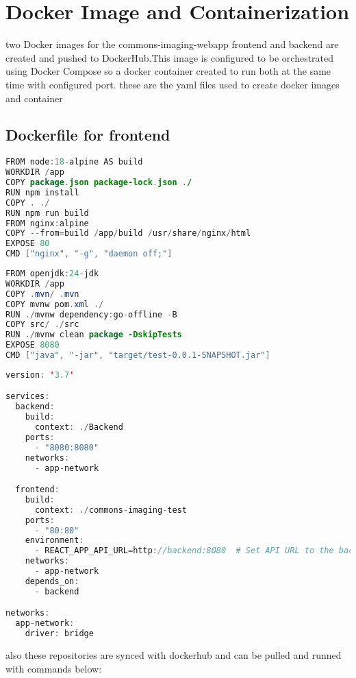 \documentclass[a4paper,12pt]{report}
\begin{document}
\chapter{Docker Image and Containerization}
two Docker images for the commons-imaging-webapp frontend and backend are created and pushed to DockerHub.This image is configured to be orchestrated using Docker Compose so a docker container created to run both at the same time with configured port.
these are the yaml files used to create docker images and container

\section{Dockerfile for frontend}
\begin{lstlisting}[language=java, caption=Dockerfile for commons-imaging-test-frontend]
FROM node:18-alpine AS build
WORKDIR /app
COPY package.json package-lock.json ./
RUN npm install
COPY . ./
RUN npm run build
FROM nginx:alpine
COPY --from=build /app/build /usr/share/nginx/html
EXPOSE 80
CMD ["nginx", "-g", "daemon off;"]
\end{lstlisting}

\begin{lstlisting}[language=java, caption=Dockerfile for commons-imaging-test-backend]
FROM openjdk:24-jdk
WORKDIR /app
COPY .mvn/ .mvn
COPY mvnw pom.xml ./
RUN ./mvnw dependency:go-offline -B
COPY src/ ./src
RUN ./mvnw clean package -DskipTests
EXPOSE 8080
CMD ["java", "-jar", "target/test-0.0.1-SNAPSHOT.jar"]
\end{lstlisting}

\begin{lstlisting}[language=java, caption=Example Dockerfile for container compose]
version: '3.7'

services:
  backend:
    build:
      context: ./Backend
    ports:
      - "8080:8080"
    networks:
      - app-network

  frontend:
    build:
      context: ./commons-imaging-test
    ports:
      - "80:80"
    environment:
      - REACT_APP_API_URL=http://backend:8080  # Set API URL to the backend service name
    networks:
      - app-network
    depends_on:
      - backend

networks:
  app-network:
    driver: bridge
\end{lstlisting}


also these repositories are synced with dockerhub and can be pulled and runned with commands below:
\end{document}
